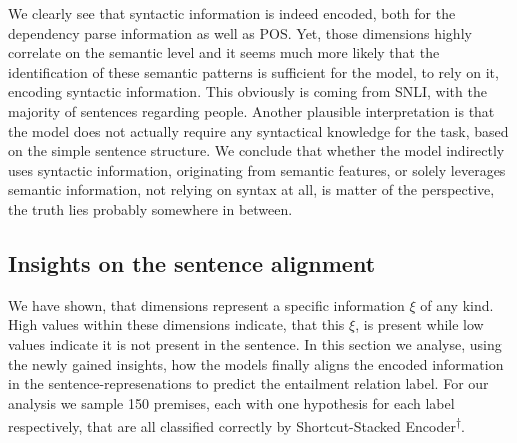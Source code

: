 \noindent
We clearly see that syntactic information is indeed encoded, both for the dependency parse information as well as \ac{POS}. Yet, those dimensions highly correlate on the semantic level and it seems much more likely that the identification of these semantic patterns is sufficient for the model, to rely on it, encoding syntactic information. This obviously is coming from \ac{SNLI}, with the majority of sentences regarding people. Another plausible interpretation is that the model does not actually require any syntactical knowledge for the task, based on the simple sentence structure. We conclude that whether the model indirectly uses syntactic information, originating from semantic features, or solely leverages semantic information, not relying on syntax at all, is matter of the perspective, the truth lies probably somewhere in between. 

\subsection{Insights on the sentence alignment}\label{sec:insights_sent_alignment}
We have shown, that dimensions represent a specific information $\xi$ of any kind. High values within these dimensions indicate, that this $\xi$, is present while low values indicate it is not present in the sentence. In this section we analyse, using the newly gained insights, how the models finally aligns the encoded information in the sentence-represenations to predict the entailment relation label. For our analysis we sample 150 premises, each with one hypothesis for each label respectively, that are all classified correctly by Shortcut-Stacked Encoder\textsuperscript{$\dagger$}. 

